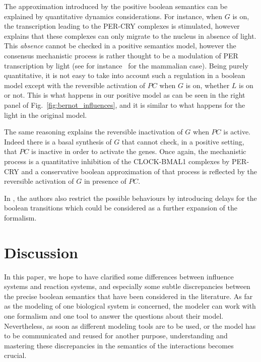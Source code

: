 \documentclass{llncs}
\begin{document}
The approximation introduced by the positive boolean semantics can be explained by quantitative dynamics considerations.
For instance, when $G$ is on, the transcription leading to the
PER-CRY complexes is stimulated, however~\cite{CBDDMC12pcs} explains that
these complexes can only migrate to the nucleus in absence of light. This
\emph{absence} cannot be checked in a positive semantics model, however the
consensus mechanistic process is rather thought to be a modulation of PER
transcription by light (see for instance~\cite{LG03pnas} for the mammalian
case). Being purely quantitative, it is not easy to take into account such a
regulation in a boolean model except with the reversible activation of $PC$
when $G$ is on, whether $L$ is on or not. This is what happens in our positive
model as can be seen in the right panel of Fig.~\ref{fig:bernot_influences},
and it is similar to what happens for the light in the original model.

The same reasoning explains the reversible inactivation of $G$ when $PC$ is
active. Indeed there is a basal synthesis of $G$ that cannot check, in a
positive setting, that $PC$ is inactive in order to activate the genes. Once
again, the mechanistic process is a quantitative inhibition of the CLOCK-BMAL1
complexes by PER-CRY and a conservative boolean approximation of that process
is reflected by the reversible activation of $G$ in presence of $PC$.

In \cite{CBDDMC12pcs}, the authors also restrict the possible behaviours by introducing delays
for the boolean transitions which could be considered as a further expansion of the formalism.




\section{Discussion}

In this paper, we hope to have clarified some differences between influence systems and reaction systems,
and especially some subtle discrepancies between the precise boolean semantics that have been considered in the literature.
As far as the modeling of one biological system is concerned, the modeler can work with one formalism and one tool
to answer the questions about their model. Nevertheless, as soon as different modeling tools are to be used,
or the model has to be communicated and reused for another purpose, understanding and mastering these discrepancies in the semantics
of the interactions becomes crucial.
\end{document}
